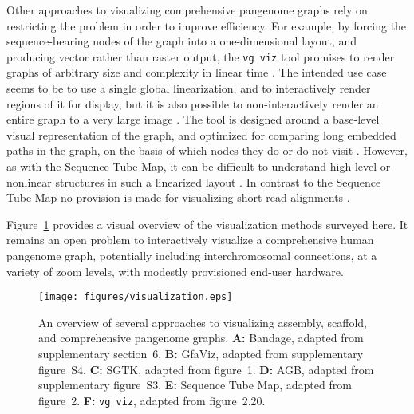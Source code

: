 Other approaches to visualizing comprehensive pangenome graphs rely on restricting the problem in order to improve efficiency.
For example, by forcing the sequence-bearing nodes of the graph into a one-dimensional layout, and producing vector rather than raster output, the \texttt{vg viz} tool promises to render graphs of arbitrary size and complexity in linear time \citep{Garrison_2019}. The intended use case seems to be to use a single global linearization, and to interactively render regions of it for display, but it is also possible to non-interactively render an entire graph to a very large image \citep{Garrison_2019}. The tool is designed around a base-level visual representation of the graph, and optimized for comparing long embedded paths in the graph, on the basis of which nodes they do or do not visit \citep{Garrison_2019}. However, as with the Sequence Tube Map, it can be difficult to understand high-level or nonlinear structures in such a linearized layout \citep{Garrison_2019}. In contrast to the Sequence Tube Map no provision is made for visualizing short read alignments \citep{Garrison_2019}.

Figure~\ref{fig:visualization} provides a visual overview of the visualization methods surveyed here. It remains an open problem to interactively visualize a comprehensive human pangenome graph, potentially including interchromosomal connections, at a variety of zoom levels, with modestly provisioned end-user hardware.

\begin{figure}[h]
    \texttt{[image: figures/visualization.eps]}
    \caption{\label{fig:visualization} An overview of several approaches to visualizing assembly, scaffold, and comprehensive pangenome graphs. \textbf{A:} Bandage, adapted from \cite{Wick_2015} supplementary section~6. \textbf{B:} GfaViz, adapted from \cite{Gonnella_2018} supplementary figure~S4. \textbf{C:} SGTK, adapted from \cite{Kunyavskaya_2018} figure~1. \textbf{D:} AGB, adapted from \cite{Mikheenko_2019} supplementary figure~S3. \textbf{E:} Sequence Tube Map, adapted from \cite{Beyer_2019} figure~2. \textbf{F:} \texttt{vg viz}, adapted from \cite{Garrison_2019} figure~2.20.}
\end{figure}

